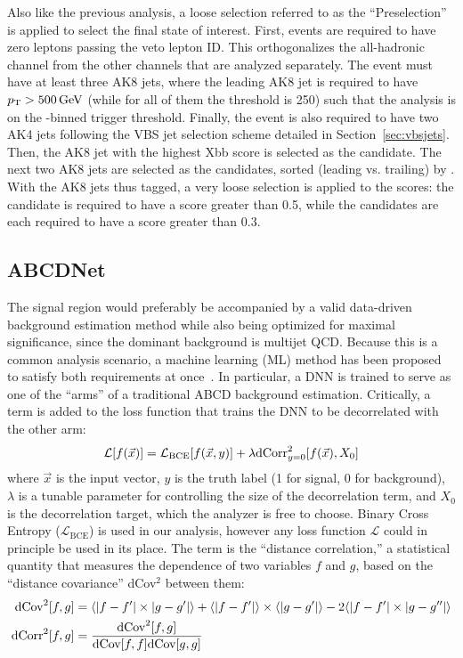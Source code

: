 Also like the previous analysis, a loose selection referred to as the ``Preselection'' is applied to select the final state of interest. 
First, events are required to have zero leptons passing the veto lepton ID. 
This orthogonalizes the all-hadronic channel from the other channels that are analyzed separately. 
The event must have at least three AK8 jets, where the leading AK8 jet is required to have $p_{\mathrm{T}} > 500\,\text{Ge\hspace{-.08em}V}$ (while for all of them the \pt threshold is 250\GeV) such that the analysis is on the \HT-binned trigger threshold. 
Finally, the event is also required to have two AK4 jets following the VBS jet selection scheme detailed in Section~\ref{sec:vbsjets}.
Then, the AK8 jet with the highest \ParticleNet Xbb score is selected as the \Htobb candidate. 
The next two AK8 jets are selected as the \Vtoqq candidates, sorted (leading vs. trailing) by \pt.
With the AK8 jets thus tagged, a very loose selection is applied to the \ParticleNet scores: the \Htobb candidate is required to have a \ParticleNet \Xtobb score greater than 0.5, while the \Vtoqq candidates are each required to have a \ParticleNet \XWtoqq score greater than 0.3.

\subsection{ABCDNet}
The signal region would preferably be accompanied by a valid data-driven background estimation method while also being optimized for maximal significance, since the dominant background is multijet QCD.
Because this is a common analysis scenario, a machine learning (ML) method has been proposed to satisfy both requirements at once~\cite{AutoABCD}. 
In particular, a DNN is trained to serve as one of the ``arms'' of a traditional ABCD background estimation. 
Critically, a \dCorrSq term is added to the loss function that trains the DNN to be decorrelated with the other arm:
\begin{equation}
    \mathcal{L}[f(\vec{x})] = \mathcal{L}_\mathrm{BCE}[f(\vec{x}, y)] + \lambda\text{dCorr}^2_{y=0}[f(\vec{x}), X_0]
\end{equation}
where $\vec{x}$ is the input vector, $y$ is the truth label (1 for signal, 0 for background), $\lambda$ is a tunable parameter for controlling the size of the decorrelation term, and $X_0$ is the decorrelation target, which the analyzer is free to choose.
Binary Cross Entropy ($\mathcal{L}_\mathrm{BCE}$) is used in our analysis, however any loss function $\mathcal{L}$ could in principle be used in its place.
The \dCorrSq term is the ``distance correlation,'' a statistical quantity that measures the dependence of two variables $f$ and $g$, based on the ``distance covariance'' dCov$^2$ between them:
\begin{align}
    \text{dCov}^2[f,g] &= \langle|f-f'|\times|g-g'|\rangle + \langle|f-f'|\rangle\times\langle|g-g'|\rangle - 2\langle|f - f'|\times|g-g''|\rangle \\
    \text{dCorr}^2[f,g] &= \frac{\text{dCov}^2[f, g]}{\text{dCov}[f, f]\text{dCov}[g, g]} \label{dCorrEq}
\end{align}

